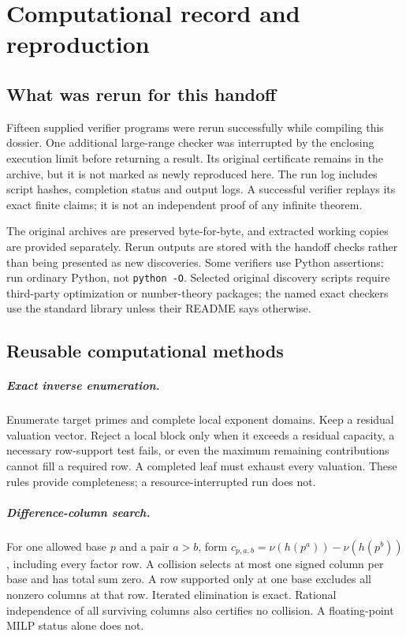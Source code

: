 \chapter{Computational record and reproduction}\label{ch:repro}
\section{What was rerun for this handoff}
Fifteen supplied verifier programs were rerun successfully while compiling this
dossier. One additional large-range checker was interrupted by the enclosing
execution limit before returning a result. Its original certificate remains in
the archive, but it is not marked as newly reproduced here. The run log includes
script hashes, completion status and output logs. A successful verifier replays
its exact finite claims; it is not an independent proof of any infinite theorem.

The original archives are preserved byte-for-byte, and extracted working copies
are provided separately. Rerun outputs are stored with the handoff checks rather
than being presented as new discoveries. Some verifiers use Python assertions:
run ordinary Python, not \texttt{python -O}. Selected original discovery scripts
require third-party optimization or number-theory packages; the named exact
checkers use the standard library unless their README says otherwise.

\section{Reusable computational methods}
\paragraph{Exact inverse enumeration.}
Enumerate target primes and complete local exponent domains. Keep a residual
valuation vector. Reject a local block only when it exceeds a residual capacity,
a necessary row-support test fails, or even the maximum remaining contributions
cannot fill a required row. A completed leaf must exhaust every valuation.
These rules provide completeness; a resource-interrupted run does not.

\paragraph{Difference-column search.}
For one allowed base $p$ and a pair $a>b$, form
$c_{p,a,b}=\nu(h(p^a))-\nu(h(p^b))$, including every factor row. A collision
selects at most one signed column per base and has total sum zero. A row
supported only at one base excludes all nonzero columns at that row. Iterated
elimination is exact. Rational independence of all surviving columns also
certifies no collision. A floating-point MILP status alone does not.

